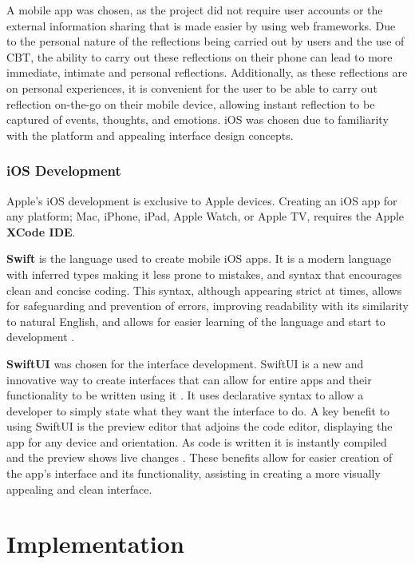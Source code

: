 \documentclass{l4proj}
\begin{document}
A mobile app was chosen, as the project did not require user accounts or the external information sharing that is made easier by using web frameworks. Due to the personal nature of the reflections being carried out by users and the use of CBT, the ability to carry out these reflections on their phone can lead to more immediate, intimate and personal reflections. Additionally, as these reflections are on personal experiences, it is convenient for the user to be able to carry out reflection on-the-go on their mobile device, allowing instant reflection to be captured of events, thoughts, and emotions. iOS was chosen due to familiarity with the platform and appealing interface design concepts.

\subsection{iOS Development}

Apple's iOS development is exclusive to Apple devices. Creating an iOS app for any platform; Mac, iPhone, iPad, Apple Watch, or Apple TV, requires the Apple \textbf{XCode IDE}. 

\textbf{Swift} is the language used to create mobile iOS apps. It is a modern language with inferred types making it less prone to mistakes, and syntax that encourages clean and concise coding. This syntax, although appearing strict at times, allows for safeguarding and prevention of errors, improving readability with its similarity to natural English, and allows for easier learning of the language and start to development \citep{altexsoft_swift_2021}.

\textbf{SwiftUI} was chosen for the interface development. SwiftUI is a new and innovative way to create interfaces that can allow for entire apps and their functionality to be written using it \citep{apple_developer_xcode_2021}. It uses declarative syntax to allow a developer to simply state what they want the interface to do. A key benefit to using SwiftUI is the preview editor that adjoins the code editor, displaying the app for any device and orientation. As code is written it is instantly compiled and the preview shows live changes \citep{apple_swiftui_2021}. These benefits allow for easier creation of the app's interface and its functionality, assisting in creating a more visually appealing and clean interface.


\chapter{Implementation} \label{implementation}
\end{document}
